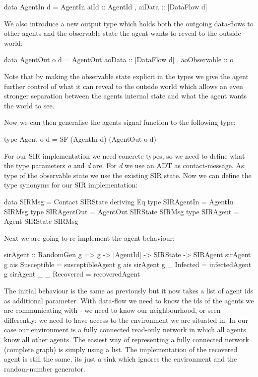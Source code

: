 \begin{HaskellCode}
data AgentIn d = AgentIn
  { aiId   :: AgentId
  , aiData :: [DataFlow d] } 
\end{HaskellCode}

We also introduce a new output type which holds both the outgoing data-flows to other agents and the observable state the agent wants to reveal to the outside world:

\begin{HaskellCode}
data AgentOut o d = AgentOut
  { aoData        :: [DataFlow d]
  , aoObservable  :: o }
\end{HaskellCode}

Note that by making the observable state explicit in the types we give the agent further control of what it can reveal to the outside world which allows an even stronger separation between the agents internal state and what the agent wants the world to see.

Now we can then generalise the agents signal function to the following type:
\begin{HaskellCode}
type Agent o d = SF (AgentIn d) (AgentOut o d)
\end{HaskellCode}

For our SIR implementation we need concrete types, so we need to define what the type parameters \textit{o} and \textit{d} are. For \textit{d} we use an ADT as contact-message. As type of the observable state we use the existing SIR state. Now we can define the type synonyms for our SIR implementation:
\begin{HaskellCode}
data SIRMsg      = Contact SIRState deriving Eq
type SIRAgentIn  = AgentIn SIRMsg
type SIRAgentOut = AgentOut SIRState SIRMsg
type SIRAgent    = Agent SIRState SIRMsg
\end{HaskellCode}

Next we are going to re-implement the agent-behaviour:

\begin{HaskellCode}
sirAgent :: RandomGen g => g -> [AgentId] -> SIRState -> SIRAgent
sirAgent g ais Susceptible = susceptibleAgent g ais
sirAgent g _   Infected    = infectedAgent g
sirAgent _ _   Recovered   = recoveredAgent
\end{HaskellCode}

The initial behaviour is the same as previously but it now takes a list of agent ids as additional parameter. With data-flow we need to know the ids of the agents we are communicating with - we need to know our neighbourhood, or seen differently: we need to have access to the environment we are situated in. In our case our environment is a fully connected read-only network in which all agents know all other agents. The easiest way of representing a fully connected network (complete graph) is simply using a list. 
The implementation of the recovered agent is still the same, its just a sink which ignores the environment and the random-number generator. 

